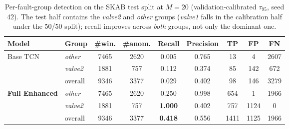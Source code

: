 \begin{table}[H]
\centering
\caption{Per-fault-group detection on the SKAB test split at $M=20$ (validation-calibrated $\tau_{95}$, seed 42). The test half contains the \emph{valve2} and \emph{other} groups (\emph{valve1} falls in the calibration half under the 50/50 split); recall improves across \emph{both} groups, not only the dominant one.}
\label{table:skab_perclass}
\setlength{\tabcolsep}{5pt}\small
\begin{tabular}{llccccccc}
\toprule
\textbf{Model} & \textbf{Group} & \textbf{\#win.} & \textbf{\#anom.} & \textbf{Recall} & \textbf{Precision} & \textbf{TP} & \textbf{FP} & \textbf{FN} \\
\midrule
\multirow{3}{*}{Base TCN}
 & \emph{other}  & 7465 & 2620 & 0.005 & 0.765 & 13   & 4    & 2607 \\
 & \emph{valve2} & 1881 & 757  & 0.112 & 0.374 & 85   & 142  & 672  \\
 & overall       & 9346 & 3377 & 0.029 & 0.402 & 98   & 146  & 3279 \\
\midrule
\multirow{3}{*}{\textbf{Full Enhanced}}
 & \emph{other}  & 7465 & 2620 & 0.250 & 0.998 & 654  & 1    & 1966 \\
 & \emph{valve2} & 1881 & 757  & \textbf{1.000} & 0.402 & 757  & 1124 & 0 \\
 & overall       & 9346 & 3377 & \textbf{0.418} & 0.556 & 1411 & 1125 & 1966 \\
\bottomrule
\end{tabular}
\end{table}
